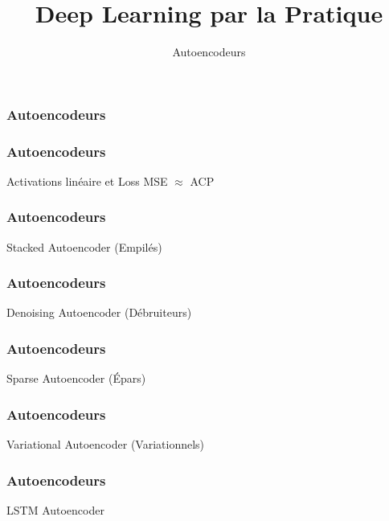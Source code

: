 \documentclass{formation}
\title{Deep Learning par la Pratique}
\subtitle{Autoencodeurs}
\begin{document}
\maketitle

\begin{frame}
  \frametitle{Autoencodeurs}
\end{frame}

\begin{frame}
  \frametitle{Autoencodeurs}
  Activations linéaire et Loss MSE $\approx$ ACP
\end{frame}

\begin{frame}
  \frametitle{Autoencodeurs}
  Stacked Autoencoder (Empilés)
\end{frame}

\begin{frame}
  \frametitle{Autoencodeurs}
  Denoising Autoencoder (Débruiteurs)
\end{frame}

\begin{frame}
  \frametitle{Autoencodeurs}
  Sparse Autoencoder (Épars)
\end{frame}

\begin{frame}
  \frametitle{Autoencodeurs}
  Variational Autoencoder (Variationnels)
\end{frame}

\begin{frame}
  \frametitle{Autoencodeurs}
  LSTM Autoencoder
\end{frame}
\end{document}
